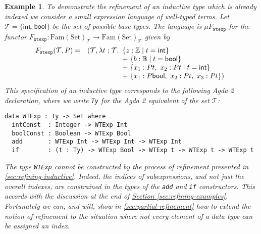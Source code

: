 \documentclass{LMCS}
\newcommand{\tyname}[1]{\texttt{#1}}
\newcommand{\sepbar}{\mathrel|}
\newcommand{\Fam}{\mathrm{Fam}}
\newcommand{\Set}{\mathrm{Set}}
\newtheorem{eorollary}{Example}
\begin{document}
\begin{eorollary}\label{ex:indexed-refinement}
  To demonstrate the refinement of an inductive type which is already
  indexed we consider a small expression language of well-typed
  terms. Let $\mathcal{T} = \{ \mathsf{int}, \mathsf{bool} \}$ be the
  set of possible base types. The language is $\mu F_{\tyname{wtexp}}$
  for the functor $F_{\tyname{wtexp}} : \Fam(\Set)_{\mathcal{T}} \to
  \Fam(\Set)_{\mathcal{T}}$ given by
\begin{eqnarray*}
  F_{\tyname{wtexp}}(\mathcal{T},P) & = &
  (\mathcal{T}, \lambda t : \mathcal{T}.\begin{array}[t]{l}
    \{ z : \mathbb{Z} \sepbar t = \mathsf{int} \} \\
    +\ \{ b : \mathbb{B} \sepbar t = \mathsf{bool} \} \\
    +\ \{ x_1 :  P t,\ x_2 : P t \sepbar t = \mathsf{int} \} \\
    +\ \{ x_1 : P \mathsf{bool},\ x_2 : P t,\ x_3 : P t \})
  \end{array}
\end{eqnarray*}
This specification of an inductive type corresponds to the following
Agda 2 declaration, where we write \verb|Ty| for the Agda 2
equivalent of the set $\mathcal{T}$:
\begin{verbatim}
data WTExp : Ty -> Set where
  intConst  : Integer -> WTExp Int
  boolConst : Boolean -> WTExp Bool
  add       : WTExp Int -> WTExp Int -> WTExp Int
  if        : (t : Ty) -> WTExp Bool -> WTExp t -> WTExp t -> WTExp t
\end{verbatim}
The type \verb|WTExp| cannot be constructed by the process of
refinement presented in \autoref{sec:refining-inductive}. Indeed, the
indices of subexpressions, and not just the overall indexes, are
constrained in the types of the \texttt{add} and \texttt{if}
constructors. This accords with the discussion at the end of
\hyperref[sec:refining-examples]{Section
  \ref*{sec:refining-examples}}. Fortunately we can, and will, show in
\autoref{sec:partial-refinement} how to extend the notion of
refinement to the situation where not every element of a data type can
be assigned an index.


\end{eorollary}
\end{document}
